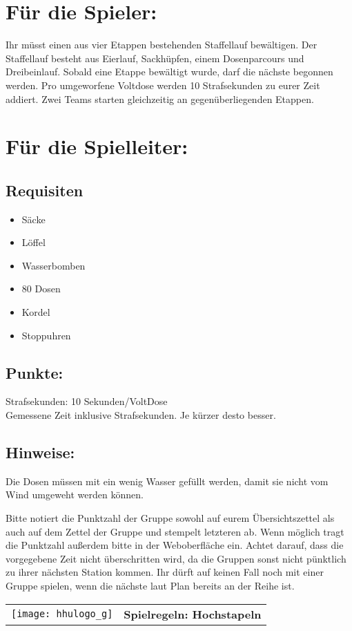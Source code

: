 \documentclass[a4paper,10pt]{article}
\def\spielc{Hochstapeln}
\newcommand{\unten}{
 Bitte notiert die Punktzahl der Gruppe sowohl auf eurem Übersichtszettel als auch auf dem Zettel der Gruppe und stempelt letzteren ab. Wenn möglich tragt die Punktzahl außerdem bitte in der Weboberfläche ein.
 Achtet darauf, dass die vorgegebene Zeit nicht überschritten wird, da die Gruppen sonst nicht pünktlich zu ihrer nächsten Station kommen. Ihr dürft auf keinen Fall noch mit einer Gruppe spielen, wenn die nächste laut Plan bereits an der Reihe ist.
}
\begin{document}
\Large
\section*{Für die Spieler:}
Ihr müsst einen aus vier Etappen bestehenden Staffellauf bewältigen. 
Der Staffellauf besteht aus Eierlauf, Sackhüpfen, einem Dosenparcours und 
Dreibeinlauf. Sobald eine Etappe bewältigt wurde, darf die nächste begonnen
werden. Pro umgeworfene Voltdose werden 10 Strafsekunden zu eurer Zeit 
addiert. Zwei Teams starten gleichzeitig an gegenüberliegenden Etappen.

\section*{Für die Spielleiter:}
\subsection*{Requisiten}
\begin{itemize}
\item Säcke
\item Löffel
\item Wasserbomben
\item 80 Dosen
\item Kordel
\item Stoppuhren
\end{itemize}
\subsection*{Punkte:}
Strafsekunden: 10 Sekunden/VoltDose\\
Gemessene Zeit inklusive Strafsekunden. Je kürzer desto besser.

\subsection*{Hinweise:}
Die Dosen müssen mit ein wenig Wasser gefüllt werden, damit sie nicht vom Wind umgeweht werden können.
\unten

\newpage


  \begin{tabularx}{\textwidth}{lc}
    \texttt{[image: hhulogo\_g]}
  & {\Huge \textbf{Spielregeln: \spielc}}
  \end{tabularx}\\

\Large
\end{document}
